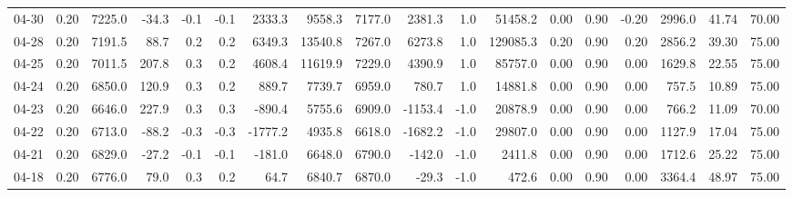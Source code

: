 \begin{threeparttable}
{\begin{tabular}{lrrrrrrrrrrrrrrrrr}
  04-30 &     0.20 & 7225.0 &             -34.3 &              -0.1 &               -0.1 &             2333.3 &  9558.3 & 7177.0 &     2381.3 &                      1.0 &             51458.2 &       0.00 &      0.90 &          -0.20 &           2996.0 &           41.74 &                  70.00 \\
  04-28 &     0.20 & 7191.5 &              88.7 &               0.2 &                0.2 &             6349.3 & 13540.8 & 7267.0 &     6273.8 &                      1.0 &            129085.3 &       0.20 &      0.90 &           0.20 &           2856.2 &           39.30 &                  75.00 \\
  04-25 &     0.20 & 7011.5 &             207.8 &               0.3 &                0.2 &             4608.4 & 11619.9 & 7229.0 &     4390.9 &                      1.0 &             85757.0 &       0.00 &      0.90 &           0.00 &           1629.8 &           22.55 &                  75.00 \\
  04-24 &     0.20 & 6850.0 &             120.9 &               0.3 &                0.2 &              889.7 &  7739.7 & 6959.0 &      780.7 &                      1.0 &             14881.8 &       0.00 &      0.90 &           0.00 &            757.5 &           10.89 &                  75.00 \\
  04-23 &     0.20 & 6646.0 &             227.9 &               0.3 &                0.3 &             -890.4 &  5755.6 & 6909.0 &    -1153.4 &                     -1.0 &             20878.9 &       0.00 &      0.90 &           0.00 &            766.2 &           11.09 &                  70.00 \\
  04-22 &     0.20 & 6713.0 &             -88.2 &              -0.3 &               -0.3 &            -1777.2 &  4935.8 & 6618.0 &    -1682.2 &                     -1.0 &             29807.0 &       0.00 &      0.90 &           0.00 &           1127.9 &           17.04 &                  75.00 \\
  04-21 &     0.20 & 6829.0 &             -27.2 &              -0.1 &               -0.1 &             -181.0 &  6648.0 & 6790.0 &     -142.0 &                     -1.0 &              2411.8 &       0.00 &      0.90 &           0.00 &           1712.6 &           25.22 &                  75.00 \\
  04-18 &     0.20 & 6776.0 &              79.0 &               0.3 &                0.2 &               64.7 &  6840.7 & 6870.0 &      -29.3 &                     -1.0 &               472.6 &       0.00 &      0.90 &           0.00 &           3364.4 &           48.97 &                  75.00 \\

\end{tabular}}
\end{threeparttable}
